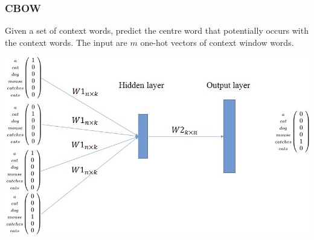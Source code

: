 \documentclass[11pt]{article}
\begin{document}
\subsubsection{CBOW}
\begin{minipage}{0.5\linewidth}
	Given a set of context words, predict the centre word that potentially occurs with the context words. The input are $m$ one-hot vectors of context window words.
	\vspace{5em}
\end{minipage}
\begin{minipage}{0.5\linewidth}
	\begin{center}
		\includegraphics[width=0.9\linewidth]{img/word2vec_cbow}
	\end{center}
\end{minipage}
\end{document}
